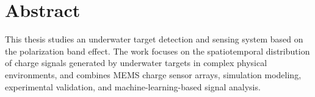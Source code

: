 \chapter*{Abstract}
This thesis studies an underwater target detection and sensing system based on the polarization band effect. The work focuses on the spatiotemporal distribution of charge signals generated by underwater targets in complex physical environments, and combines MEMS charge sensor arrays, simulation modeling, experimental validation, and machine-learning-based signal analysis.

\clearpage
